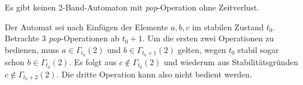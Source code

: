 \documentclass{article}
\begin{document}
\begin{satz}
    Es gibt keinen 2-Band-Automaton mit \emph{pop}-Operation ohne Zeitverlust.
    \begin{beweis}
        Der Automat sei nach Einfügen der Elemente $a, b, c$ im stabilen Zustand $t_0$. Betrachte 3 \emph{pop}-Operationen ab $t_0+1$. Um die ersten zwei Operationen zu bedienen, muss $a \in \Gamma_{t_0}(2)$ und $b \in \Gamma_{t_0+1}(2)$ gelten, wegen $t_0$ stabil sogar schon $b \in \Gamma_{t_0}(2)$. Es folgt aus  $c \notin \Gamma_{t_0}(2)$ und wiederum aus Stabilitätsgründen $c \notin \Gamma_{t_0+2}(2)$. Die dritte Operation kann also nicht bedient werden.
    \end{beweis}
\end{satz}
\end{document}
